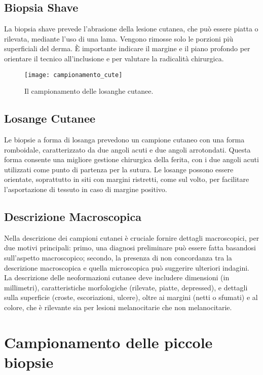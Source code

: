 \subsection{Biopsia Shave}
La biopsia shave prevede l'abrasione della lesione cutanea, che può essere piatta o rilevata, mediante l'uso di una lama. Vengono rimosse solo le porzioni più superficiali del derma. È importante indicare il margine e il piano profondo per orientare il tecnico all'inclusione e per valutare la radicalità chirurgica.


\begin{figure}[p]
    \centering
    \texttt{[image: campionamento\_cute]}
    \caption{Il campionamento delle losanghe cutanee.}
    \label{fig:campionamento_cute}
\end{figure}


\subsection{Losange Cutanee}
Le biopsie a forma di losanga prevedono un campione cutaneo con una forma romboidale, caratterizzato da due angoli acuti e due angoli arrotondati. Questa forma consente una migliore gestione chirurgica della ferita, con i due angoli acuti utilizzati come punto di partenza per la sutura. Le losange possono essere orientate, soprattutto in siti con margini ristretti, come sul volto, per facilitare l'asportazione di tessuto in caso di margine positivo.

\subsection{Descrizione Macroscopica}
Nella descrizione dei campioni cutanei è cruciale fornire dettagli macroscopici, per due motivi principali: primo, una diagnosi preliminare può essere fatta basandosi sull'aspetto macroscopico; secondo, la presenza di non concordanza tra la descrizione macroscopica e quella microscopica può suggerire ulteriori indagini. La descrizione delle neoformazioni cutanee deve includere dimensioni (in millimetri), caratteristiche morfologiche (rilevate, piatte, depressed), e dettagli sulla superficie (croste, escoriazioni, ulcere), oltre ai margini (netti o sfumati) e al colore, che è rilevante sia per lesioni melanocitarie che non melanocitarie.


\section{Campionamento delle piccole biopsie}

